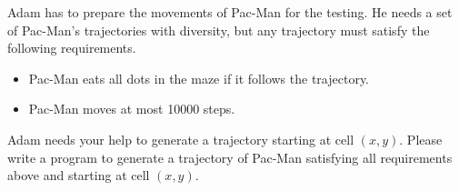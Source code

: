 Adam has to prepare the movements of Pac-Man for the testing. 
He needs a set of Pac-Man's trajectories with diversity, 
but any trajectory must satisfy the following requirements.
\begin{itemize}
\tightlist
\item Pac-Man eats all dots in the maze if it follows the trajectory.
\item Pac-Man moves at most 10000 steps.
\end{itemize}
Adam needs your help to generate a trajectory starting at cell $(x,y)$.
Please write a program to generate a trajectory of Pac-Man satisfying all 
requirements above and starting at cell $(x,y)$.

